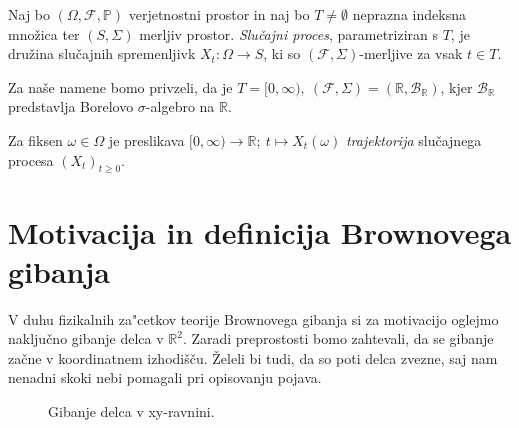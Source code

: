 \documentclass[twoside,11pt]{article}
\begin{document}
\begin{definicija}
    Naj bo $(\Omega, \mathcal{F}, \mathbb{P})$ verjetnostni prostor in naj bo $T\neq\emptyset$ neprazna
    indeksna množica ter $(S, \Sigma)$ merljiv prostor. \textit{Slučajni proces}, parametriziran
    s $T$, je družina slučajnih spremenljivk $X_t : \Omega \to S$, ki so $(\mathcal{F}, \Sigma)$-merljive
    za vsak $t \in T$.
\end{definicija}

\begin{opomba}
    Za naše namene bomo privzeli, da je $T = [0, \infty), \ (\mathcal{F}, \Sigma) = (\mathbb{R}, \mathcal{B}_{\mathbb{R}})$,
    kjer $\mathcal{B}_{\mathbb{R}}$ predstavlja Borelovo $\sigma$-algebro na $\mathbb{R}$. 
\end{opomba}
    
\begin{definicija}
    Za fiksen $\omega \in \Omega$ je preslikava 
    $[0, \infty) \rightarrow \mathbb{R}; \ t \mapsto X_t(\omega)$ 
    \textit{trajektorija} slučajnega procesa $(X_t)_{t\geq0}$.
\end{definicija}


\pagebreak

\section{Motivacija in definicija Brownovega gibanja}

V duhu fizikalnih za"cetkov teorije Brownovega gibanja si za motivacijo oglejmo naključno gibanje delca v $\mathbb{R}^2$.
Zaradi preprostosti bomo zahtevali, da se gibanje začne v koordinatnem izhodišču. Želeli bi tudi, da so 
poti delca zvezne, saj nam nenadni skoki nebi pomagali pri opisovanju pojava.  

\begin{figure}[h]
    \centering

    \caption{Gibanje delca v xy-ravnini.}
    \label{fig:slika1}
\end{figure}
\end{document}
